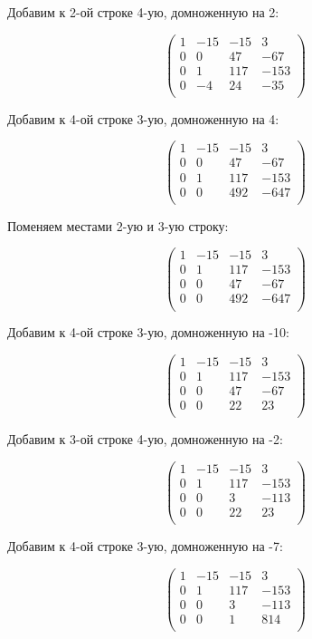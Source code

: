	Добавим к 2-ой строке 4-ую, домноженную на 2:
	
	\[
	\begin{pmatrix}
	1 & -15 & -15 & 3 \\
	0 & 0 & 47 & -67 \\
	0 & 1 & 117 & -153 \\
	0 & -4 & 24 & -35 \\
	\end{pmatrix}
	\]
	
	Добавим к 4-ой строке 3-ую, домноженную на 4:
	
	\[
	\begin{pmatrix}
	1 & -15 & -15 & 3 \\
	0 & 0 & 47 & -67 \\
	0 & 1 & 117 & -153 \\
	0 & 0 & 492 & -647 \\
	\end{pmatrix}
	\]
	
	Поменяем местами 2-ую и 3-ую строку:
	
	\[
	\begin{pmatrix}
	1 & -15 & -15 & 3 \\
	0 & 1 & 117 & -153 \\
	0 & 0 & 47 & -67 \\
	0 & 0 & 492 & -647 \\
	\end{pmatrix}
	\]
	
	Добавим к 4-ой строке 3-ую, домноженную на -10:
	
	\[
	\begin{pmatrix}
	1 & -15 & -15 & 3 \\
	0 & 1 & 117 & -153 \\
	0 & 0 & 47 & -67 \\
	0 & 0 & 22 & 23 \\
	\end{pmatrix}
	\]
	
	Добавим к 3-ой строке 4-ую, домноженную на -2:
	
	\[
	\begin{pmatrix}
	1 & -15 & -15 & 3 \\
	0 & 1 & 117 & -153 \\
	0 & 0 & 3 & -113 \\
	0 & 0 & 22 & 23 \\
	\end{pmatrix}
	\]
	
	Добавим к 4-ой строке 3-ую, домноженную на -7:
	
	\[
	\begin{pmatrix}
	1 & -15 & -15 & 3 \\
	0 & 1 & 117 & -153 \\
	0 & 0 & 3 & -113 \\
	0 & 0 & 1 & 814 \\
	\end{pmatrix}
	\]
	
